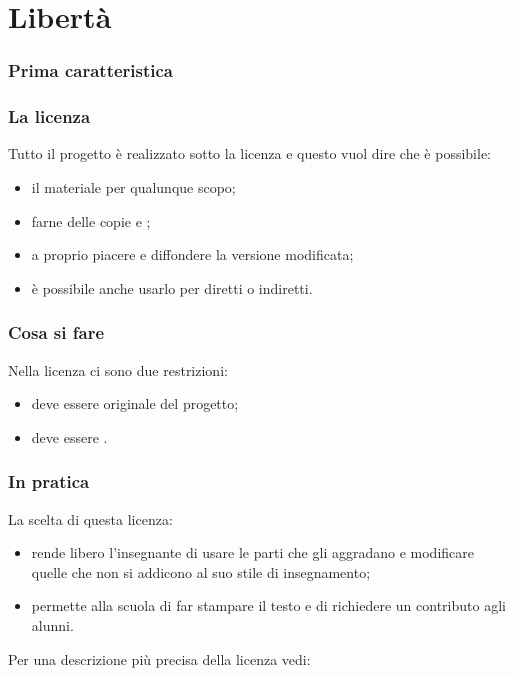 \documentclass{beamer} %
\begin{document}
\section{Libertà}


\begin{frame}\frametitle{Prima caratteristica}

\begin{center}  \end{center}

\end{frame}


\begin{frame}\frametitle{La licenza}

Tutto il progetto è realizzato sotto la licenza  
e questo vuol dire 
che è possibile:
\begin{itemize} [<+->]
\item {} il materiale per qualunque scopo;
\item farne delle copie e ;
\item {} a proprio piacere e 
diffondere la versione modificata;
\item è possibile anche usarlo per  
diretti o indiretti.
\end{itemize}

\end{frame}


\begin{frame}\frametitle{Cosa si  fare}

Nella licenza ci sono due restrizioni:

\bigskip
\begin{itemize} [<+->]
\item deve essere  originale del progetto;
\item deve essere .
\end{itemize}

\end{frame}


\begin{frame}\frametitle{In pratica}

La scelta di questa licenza:

\bigskip
\begin{itemize} [<+->]
\item rende libero l'insegnante di usare le parti che 
gli aggradano e modificare quelle che non si addicono al suo stile di 
insegnamento;
\item permette alla scuola di far stampare il testo e di richiedere un 
contributo agli alunni.
\end{itemize}

\bigskip
\pause[\thebeamerpauses]
Per una descrizione più precisa della licenza vedi:

\vspace{1em}
{\footnotesize
{}
}

\end{frame}
\end{document}
